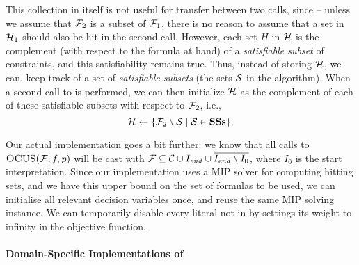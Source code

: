 This collection in itself is not useful for transfer between two calls, since -- unless we assume that $\mathcal{F} _2$ is a subset of $\mathcal{F} _1$, there is no reason to assume that a set in $\mathcal{H} _1$ should also be hit in the second call. 
However, each set $H$ in $\mathcal{H} $ is the complement (with respect to the formula at hand) of a \emph{satisfiable subset} of constraints, and this satisfiability remains true. 
Thus, instead of storing $\mathcal{H} $, we can, keep track of a set \satsets of \emph{satisfiable subsets} (the sets $\mathcal{S}$ in the \comus algorithm). 
When a second call to \comus is performed, we can then initialize $\mathcal{H} $ as the complement of each of these satisfiable subsets with respect to $\mathcal{F} _2$, i.e., \[\mathcal{H} \gets \{\mathcal{F} _2\setminus \mathcal{S}\mid \mathcal{S}\in \mathbf{SSs}\}.\]

Our actual implementation goes a bit further: we know that all calls to $\textsc{OCUS}(\mathcal{F} ,f,p)$ will be cast with $\mathcal{F}  \subseteq \mathcal{C}\cup I_\mathit{end}  \cup \overline{I_\mathit{end}  \setminus I_0}$, where $I_0$ is the start interpretation. Since our implementation uses a MIP solver for computing hitting sets, and we have this upper bound on the set of formulas to be used, we can initialise all relevant decision variables once, and reuse the same MIP solving instance. We can temporarily disable every literal not in \formula by settings its weight to infinity in the objective function.




\paragraph{Domain-Specific Implementations of \grow} \label{para:domainspecificgrow}

